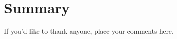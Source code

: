 \documentclass[smallextended]{svjour3}      %
\begin{document}


\section{Summary}
\label{sec:summary}



%

\begin{acknowledgements}
    If you'd like to thank anyone, place your comments here.
\end{acknowledgements}






\end{document}
